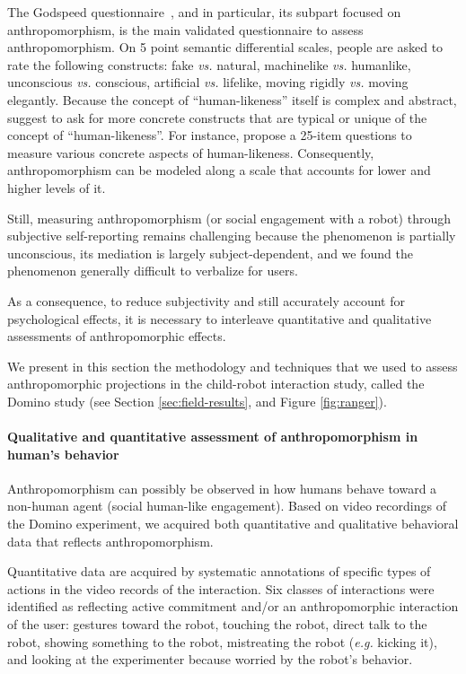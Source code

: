 \documentclass{frontiersSCNS} %
\newcommand{\eg}{\textit{e.g.}\xspace}
\newcommand{\vs}{\textit{vs.}\xspace}
\begin{document}
The Godspeed questionnaire~\citep{bartneck_measurement_2008}, and in particular,
its subpart focused on anthropomorphism, is the main validated questionnaire to
assess anthropomorphism. On 5 point semantic differential scales, people are
asked to rate the following constructs: fake \vs natural, machinelike \vs
humanlike, unconscious \vs conscious, artificial \vs lifelike, moving rigidly
\vs moving elegantly. Because the concept of ``human-likeness'' itself is
complex and abstract, \cite{kahn_jr._robotic_2006} suggest to ask for more
concrete constructs that are typical or unique of the concept of
``human-likeness''.  For instance, \cite{ruijten_introducing_2014} propose a
25-item questions to measure various concrete aspects of human-likeness.
Consequently, anthropomorphism can be modeled along a scale that accounts for
lower and higher levels of it.

Still, measuring anthropomorphism (or social engagement with a robot) through
subjective self-reporting remains challenging because the phenomenon is
partially unconscious, its mediation is largely subject-dependent, and we found
the phenomenon generally difficult to verbalize for users.

As a consequence, to reduce subjectivity and still accurately account for
psychological effects, it is necessary to interleave quantitative and
qualitative assessments of anthropomorphic effects.

We present in this section the methodology and techniques that we used to assess
anthropomorphic projections in the child-robot interaction study, called the
Domino study (see Section \ref{sec:field-results}, and Figure \ref{fig:ranger}).

\paragraph{Qualitative and quantitative assessment of anthropomorphism in
human's behavior\\}

Anthropomorphism can possibly be observed in how humans behave toward a
non-human agent (social human-like engagement). Based on video recordings of the
Domino experiment, we acquired both quantitative and qualitative behavioral data
that reflects anthropomorphism.

Quantitative data are acquired by systematic annotations of specific types of
actions in the video records of the interaction. Six classes of interactions
were identified as reflecting active commitment and/or an anthropomorphic
interaction of the user: gestures toward the robot, touching the robot, direct
talk to the robot, showing something to the robot, mistreating the robot (\eg
kicking it), and looking at the experimenter because worried by the robot's
behavior.
\end{document}
